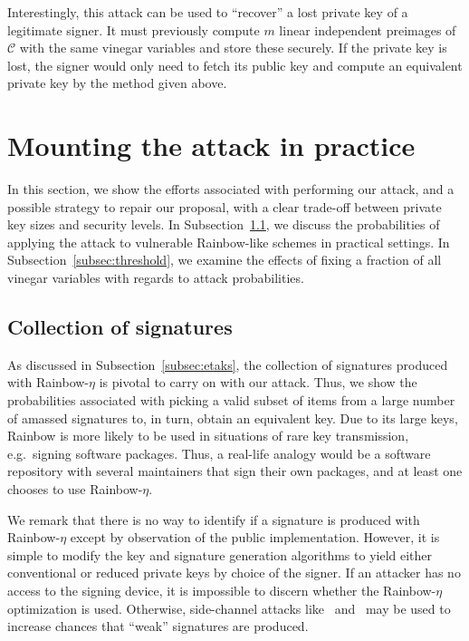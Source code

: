 \documentclass[english]{ufsc-thesis-rn46-2019/ufsc-thesis-rn46-2019}
\theoremstyle{definition}
\begin{document}
Interestingly, this attack can be used to ``recover'' a lost private key of
a legitimate signer. It must previously compute $m$ linear independent
preimages of $\mathcal{C}$ with the same vinegar variables and store these
securely. If the private key is lost, the signer would only need to fetch its
public key and compute an equivalent private key by the method given above.

\section{Mounting the attack in practice}\label{sec:mount}

In this section, we show the efforts associated with performing our attack, and
a possible strategy to repair our proposal, with a clear trade-off between
private key sizes and security levels. In Subsection~\ref{subsec:collection},
we discuss the probabilities of applying the attack to vulnerable Rainbow-like
schemes in practical settings. In Subsection~\ref{subsec:threshold}, we examine
the effects of fixing a fraction of all vinegar variables with regards to
attack probabilities.

\subsection{Collection of signatures}\label{subsec:collection}

As discussed in Subsection~\ref{subsec:etaks}, the collection of signatures
produced with Rainbow-$\eta$ is pivotal to carry on with our attack. Thus, we
show the probabilities associated with picking a valid subset of items from
a large number of amassed signatures to, in turn, obtain an equivalent key. Due
to its large keys, Rainbow is more likely to be used in situations of rare key
transmission, e.g.\ signing software packages. Thus, a real-life analogy would
be a software repository with several maintainers that sign their own packages,
and at least one chooses to use Rainbow-$\eta$.

We remark that there is no way to identify if a signature is produced with
Rainbow-$\eta$ except by observation of the public implementation. However, it
is simple to modify the key and signature generation algorithms to yield either
conventional or reduced private keys by choice of the signer. If an attacker
has no access to the signing device, it is impossible to discern whether the
Rainbow-$\eta$ optimization is used. Otherwise, side-channel attacks
like~\cite{Kramer:201903} and~\cite{Shim:201512} may be used to increase
chances that ``weak'' signatures are produced.
\end{document}
